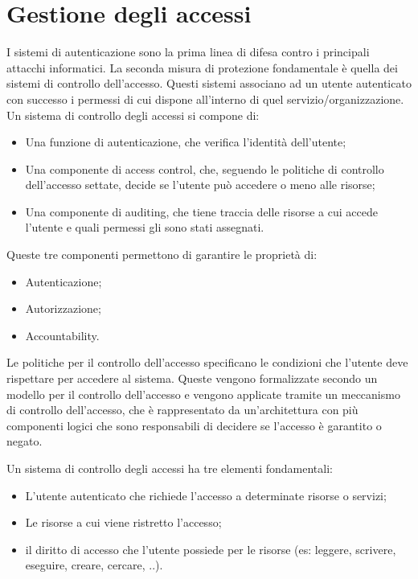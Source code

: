 \chapter{Gestione degli accessi}
I sistemi di autenticazione sono la prima linea di difesa contro i principali attacchi informatici. 
La seconda misura di protezione fondamentale è quella dei sistemi di controllo dell'accesso. Questi sistemi associano ad un utente autenticato con successo i permessi di cui dispone all'interno di quel servizio/organizzazione.
\\

\noindent Un sistema di controllo degli accessi si compone di:
\begin{itemize}
    \item Una funzione di autenticazione, che verifica l'identità dell'utente;
    \item Una componente di access control, che, seguendo le politiche di controllo dell'accesso settate, decide se l'utente può accedere o meno alle risorse;
    \item Una componente di auditing, che tiene traccia delle risorse a cui accede l'utente e quali permessi gli sono stati assegnati. 
\end{itemize}

\noindent Queste tre componenti permettono di garantire le proprietà di:
\begin{itemize}
    \item Autenticazione;
    \item Autorizzazione;
    \item Accountability.
\end{itemize}    

\noindent Le politiche per il controllo dell'accesso specificano le condizioni che l'utente deve rispettare per accedere al sistema. Queste vengono formalizzate secondo un modello per il controllo dell'accesso e vengono applicate tramite un meccanismo di controllo dell'accesso, che è rappresentato da un'architettura con più componenti logici che sono responsabili di decidere se l'accesso è garantito o negato.

Un sistema di controllo degli accessi ha tre elementi fondamentali:
\begin{itemize}
    \item L'utente autenticato che richiede l'accesso a determinate risorse o servizi;
    \item Le risorse a cui viene ristretto l'accesso;
    \item il diritto di accesso che l'utente possiede per le risorse (es: leggere, scrivere, eseguire, creare, cercare, ..).
\end{itemize}

